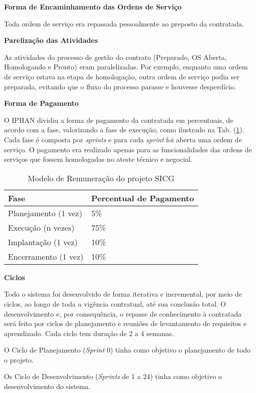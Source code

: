\textbf{Forma de Encaminhamento das Ordens de Serviço}

Toda ordem de serviço era repassada pessoalmente ao preposto da contratada.

\textbf{Parelização das Atividades}

As atividades do processo de gestão do contrato (Preparado, OS Aberta, Homologando e Pronto) eram paralelizadas. Por exemplo, enquanto uma ordem de serviço estava na etapa de homologação, outra ordem de serviço podia ser preparada, evitando que o fluxo do processo parasse e houvesse desperdício. 

\textbf{Forma de Pagamento}

O IPHAN dividiu a forma de pagamento da contratada em percentuais, de acordo com a fase, valorizando a fase de execução, como ilustrado na Tab. (\ref{remuneracao}). Cada fase
é composta por \textit{sprints} e para cada \textit{sprint} foi aberta uma ordem de serviço. O pagamento era realizado apenas para as funcionalidades das ordens de serviços que fossem homologadas no ateste técnico e negocial.


\begin{table}[htpb]
\center
\footnotesize
\begin{tabular}{|p{3cm}|p{3cm}|}
  \hline
   \textbf{Fase} & \textbf{Percentual de Pagamento}\\
    \hline
   Planejamento (1 vez) & 5\%\\
   \hline    
   Execução (n vezes) & 75\%\\
    \hline
   Implantação (1 vez) & 10\%\\
   \hline
   Encerramento (1 vez) & 10\%\\
   \hline
\end{tabular}
\caption{Modelo de Remuneração do projeto SICG}
\label{remuneracao}
\end{table}


\textbf{Ciclos}

Todo o sistema foi desenvolvido de forma iterativa e incremental, por meio de ciclos, ao longo de toda a vigência contratual, até sua conclusão total. O desenvolvimento e, por consequência, o repasse de conhecimento à contratada será feito por ciclos de planejamento e reuniões de levantamento de requisitos e aprendizado. Cada ciclo tem duração de 2 a 4 semanas.

O Ciclo de Planejamento (\textit{Sprint} 0) tinha como objetivo o planejamento de todo o projeto.

Os Ciclo de Desenvolvimento (\textit{Sprints} de 1 a 24) tinha como objetivo o desenvolvimento do sistema.

